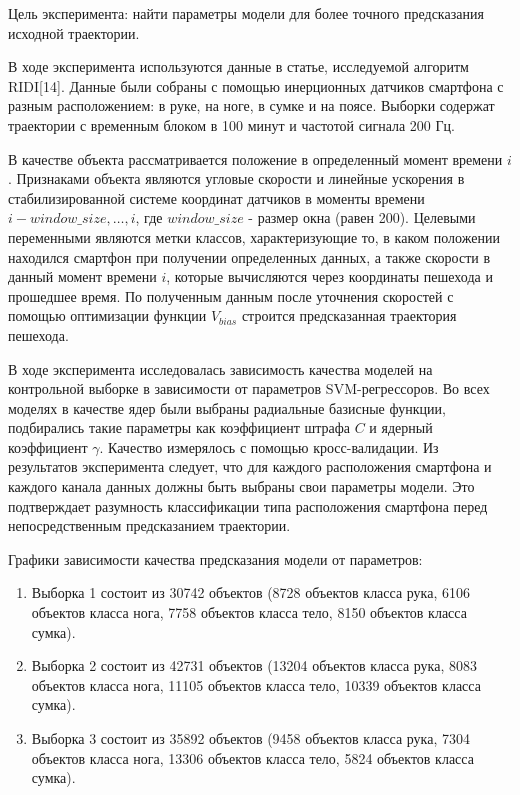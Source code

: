 \documentclass{article}
\begin{document}
Цель эксперимента: найти параметры модели для более точного предсказания исходной траектории.

В ходе эксперимента используются данные в статье, исследуемой алгоритм RIDI[14]. Данные были собраны с помощью инерционных датчиков смартфона с разным расположением: в руке, на ноге, в сумке и на поясе. Выборки содержат траектории с временным блоком в 100 минут и частотой сигнала 200 Гц.

В качестве объекта рассматривается положение в определенный момент времени $i$. Признаками объекта являются угловые скорости и линейные ускорения в стабилизированной системе координат датчиков в моменты времени $i-window\_size, \dots, i$, где $window\_size$ - размер окна (равен 200). Целевыми переменными являются метки классов, характеризующие то, в каком положении находился смартфон при получении определенных данных, а также скорости в данный момент времени $i$, которые вычисляются через координаты пешехода и прошедшее время. По полученным данным после уточнения скоростей с помощью оптимизации функции  $V_{bias}$ строится предсказанная траектория пешехода.

В ходе эксперимента исследовалась зависимость качества моделей на контрольной выборке в зависимости от параметров SVM-регрессоров.  Во всех моделях в качестве ядер были выбраны радиальные базисные функции, подбирались такие параметры как коэффициент штрафа $C$ и ядерный коэффициент $\gamma$. Качество измерялось с помощью кросс-валидации. Из результатов эксперимента следует, что для каждого расположения смартфона и каждого канала данных должны быть выбраны свои параметры модели.  Это подтверждает разумность классификации типа расположения смартфона перед непосредственным предсказанием траектории. 

Графики зависимости качества предсказания модели от параметров:

\begin{enumerate}
\item Выборка 1 состоит из 30742 объектов (8728 объектов класса рука, 6106 объектов класса нога, 7758 объектов класса тело, 8150 объектов класса сумка).
    
\item Выборка 2 состоит из 42731 объектов (13204 объектов класса рука, 8083 объектов класса нога, 11105 объектов класса тело, 10339 объектов класса сумка).
    
\item Выборка 3 состоит из 35892 объектов (9458 объектов класса рука, 7304 объектов класса нога, 13306 объектов класса тело, 5824 объектов класса сумка).
    
\end{enumerate}
\end{document}
